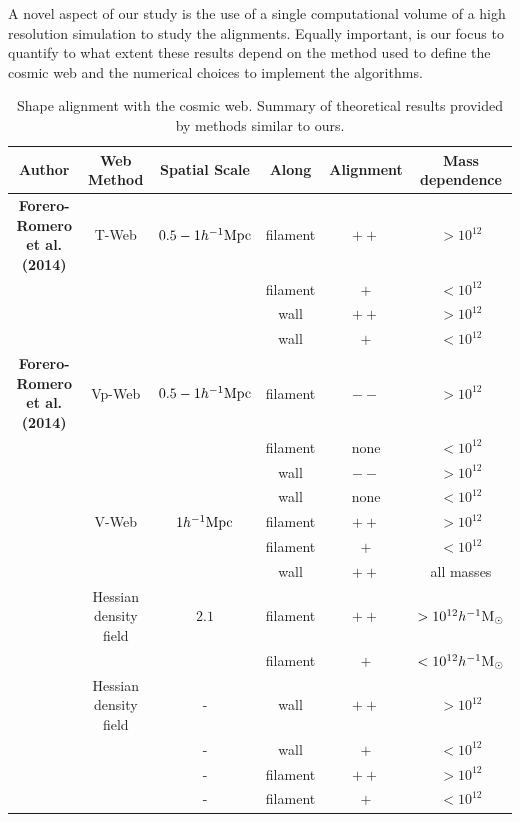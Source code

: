 \documentclass[useAMS,usenatbib]{mn2e}
\newcommand{\hMpc}{{\ifmmode{h^{-1}{\rm Mpc}}\else{$h^{-1}$Mpc }\fi}}
\newcommand{\hMsun}{{\ifmmode{h^{-1}{\rm
        {M_{\odot}}}}\else{$h^{-1}{\rm{M_{\odot}}}$~}\fi}}
\begin{document}
A novel aspect of our study is the use of a single computational
volume of a high resolution simulation to study the
alignments. Equally important, is our focus to quantify to what extent
these results depend on the method used to define the cosmic web and
the numerical choices to implement the algorithms.  

\begin{table}
\begin{tabular}{cccccc}\hline\hline
Author & Web Method & Spatial Scale & Along &
Alignment & Mass dependence\\\hline

{\bf Forero-Romero et al. (2014)} & T-Web & $0.5-1 \hMpc$ &
filament &$++$ & $>10^{12}$\hMsun\\
&   & &
filament & $+$ & $<10^{12}$\hMsun\\

&   & &
wall & $++$ & $>10^{12}$\hMsun\\

&   & &
wall & $+$ & $<10^{12}$\hMsun\\\hline

{\bf Forero-Romero et al. (2014)} & Vp-Web & $0.5-1 \hMpc$ &
filament &$--$ & $>10^{12}$\hMsun\\
&   & &
filament & none & $<10^{12}$\hMsun\\
&   & &
wall & $--$ & $>10^{12}$\hMsun\\

&   & &
wall & none & $<10^{12}$\hMsun\\\hline


\cite{Libeskind2013} & V-Web & $1 \hMpc$ &
filament &$++$ & $>10^{12}$\hMsun\\
&   & &
filament &$+$ & $<10^{12}$\hMsun\\
&   & &
wall & $++$ & all masses\\\hline

\cite{Zhang2009}  & Hessian density field &  $2.1$\hMpc &
filament & $++$ & $>10^{12}\hMsun$\\

& &  &
filament & $+$ & $<10^{12}\hMsun$\\\hline

\cite{AragonCalvo2007} & Hessian density field & - &
wall & $++$ & $>10^{12}$\hMsun\\

& & - &
wall & $+$ & $<10^{12}$\hMsun\\

& & - &
filament& $++$ & $>10^{12}$\hMsun\\

& & - &
filament& $+$ & $<10^{12}$\hMsun\\\hline \hline

\end{tabular}\\
\caption{Shape alignment with the cosmic web. Summary of theoretical
  results provided by methods similar to ours.}
\end{table}
\end{document}
